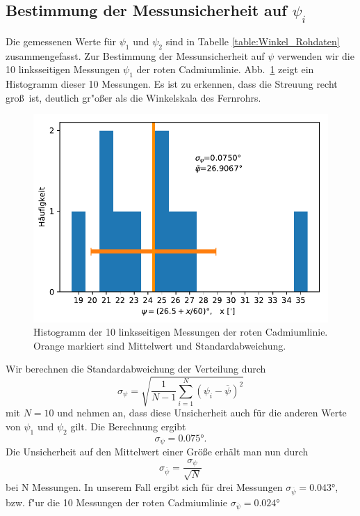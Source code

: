 \documentclass[12pt,a4paper]{article}
\begin{document}
\subsection{Bestimmung der Messunsicherheit auf  $\psi_i$}
Die gemessenen Werte für $\psi_{1}$ und $\psi_2$ sind in Tabelle \ref{table:Winkel_Rohdaten} zusammengefasst. Zur Bestimmung der Messunsicherheit auf $\psi$ verwenden wir die 10 linksseitigen Messungen $\psi_1$ der roten Cadmiumlinie. Abb.~\ref{Histogramm} zeigt ein Histogramm dieser 10 Messungen. Es ist zu erkennen, dass die Streuung recht gro\ss\ ist, deutlich gr"o\ss er als die Winkelskala des Fernrohrs.
\begin{figure}[H]
	\centering
	\includegraphics[width=0.8\linewidth]{Python/Histogramm_Psi.pdf}
	\caption{Histogramm der 10 linksseitigen Messungen der roten Cadmiumlinie.\\Orange markiert sind Mittelwert und Standardabweichung.}
	\label{Histogramm}
\end{figure}
Wir berechnen die Standardabweichung der Verteilung durch
\begin{equation}
\sigma_{\psi}=\sqrt{\frac{1}{N-1}\sum^{N}_{i=1}{(\psi_i-\overline{\psi})^2}}
\end{equation}
mit $N=10$ und nehmen an, dass diese Unsicherheit auch für die anderen Werte von $\psi_1$ und $\psi_2$ gilt. Die Berechnung ergibt
\begin{equation}
\sigma_{\psi}=\ang{0.075}.
\end{equation}
Die Unsicherheit auf den Mittelwert einer Größe erhält man nun durch
\begin{equation}
\sigma_{\overline{\psi}}=\frac{\sigma_{\psi}}{\sqrt{N}}
\end{equation}
bei N Messungen.  In unserem Fall ergibt sich für drei Messungen $\sigma_{\overline{\psi}}=\ang{0.043}$, bzw. f"ur die 10 Messungen der roten Cadmiumlinie $\sigma_{\overline{\psi}}=\ang{0.024}$
\end{document}
